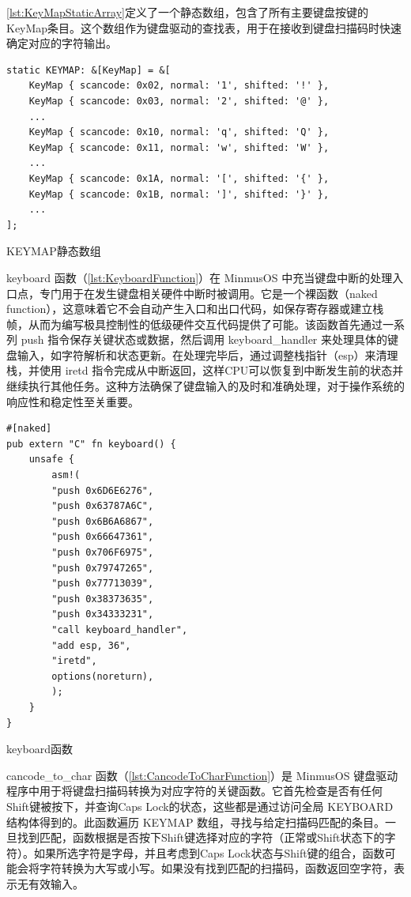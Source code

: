 \cref{lst:KeyMapStaticArray}定义了一个静态数组，包含了所有主要键盘按键的KeyMap条目。这个数组作为键盘驱动的查找表，用于在接收到键盘扫描码时快速确定对应的字符输出。

\begin{listing}[htbp]
    \begin{verbatim}
static KEYMAP: &[KeyMap] = &[
    KeyMap { scancode: 0x02, normal: '1', shifted: '!' },
    KeyMap { scancode: 0x03, normal: '2', shifted: '@' },
    ...
    KeyMap { scancode: 0x10, normal: 'q', shifted: 'Q' },
    KeyMap { scancode: 0x11, normal: 'w', shifted: 'W' },
    ...
    KeyMap { scancode: 0x1A, normal: '[', shifted: '{' },
    KeyMap { scancode: 0x1B, normal: ']', shifted: '}' },
    ...
];
    \end{verbatim}
    \caption{KEYMAP静态数组}\label{lst:KeyMapStaticArray}
\end{listing}

keyboard 函数（\cref{lst:KeyboardFunction}）在 MinmusOS 中充当键盘中断的处理入口点，专门用于在发生键盘相关硬件中断时被调用。它是一个裸函数（naked function），这意味着它不会自动产生入口和出口代码，如保存寄存器或建立栈帧，从而为编写极具控制性的低级硬件交互代码提供了可能。该函数首先通过一系列 push 指令保存关键状态或数据，然后调用 keyboard\_handler 来处理具体的键盘输入，如字符解析和状态更新。在处理完毕后，通过调整栈指针（esp）来清理栈，并使用 iretd 指令完成从中断返回，这样CPU可以恢复到中断发生前的状态并继续执行其他任务。这种方法确保了键盘输入的及时和准确处理，对于操作系统的响应性和稳定性至关重要。

\begin{listing}[htbp]
    \begin{verbatim}
#[naked]
pub extern "C" fn keyboard() {
    unsafe {
        asm!(
        "push 0x6D6E6276",
        "push 0x63787A6C",
        "push 0x6B6A6867",
        "push 0x66647361",
        "push 0x706F6975",
        "push 0x79747265",
        "push 0x77713039",
        "push 0x38373635",
        "push 0x34333231",
        "call keyboard_handler",
        "add esp, 36",
        "iretd",
        options(noreturn),
        );
    }
}
    \end{verbatim}
    \caption{keyboard函数}\label{lst:KeyboardFunction}
\end{listing}

cancode\_to\_char 函数（\cref{lst:CancodeToCharFunction}）是 MinmusOS 键盘驱动程序中用于将键盘扫描码转换为对应字符的关键函数。它首先检查是否有任何Shift键被按下，并查询Caps Lock的状态，这些都是通过访问全局 KEYBOARD 结构体得到的。此函数遍历 KEYMAP 数组，寻找与给定扫描码匹配的条目。一旦找到匹配，函数根据是否按下Shift键选择对应的字符（正常或Shift状态下的字符）。如果所选字符是字母，并且考虑到Caps Lock状态与Shift键的组合，函数可能会将字符转换为大写或小写。如果没有找到匹配的扫描码，函数返回空字符，表示无有效输入。

